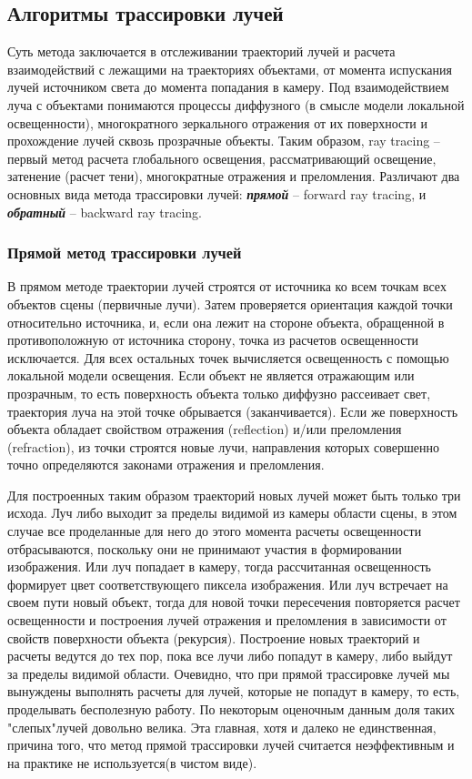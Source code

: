 \subsection{Алгоритмы трассировки лучей}
Суть метода заключается в отслеживании траекторий лучей и расчета взаимодействий с лежащими на траекториях объектами, от момента испускания лучей источником света до момента попадания в камеру. Под взаимодействием луча с объектами понимаются процессы диффузного (в смысле модели локальной освещенности), многократного зеркального отражения от их поверхности и прохождение лучей сквозь прозрачные объекты. Таким образом, ray tracing – первый метод расчета глобального освещения, рассматривающий освещение, затенение (расчет тени), многократные отражения и преломления. Различают два основных вида метода трассировки лучей: \textbf{\textit{прямой}} -- forward ray tracing, и \textbf{\textit{обратный}} -- backward ray tracing.

\subsubsection{Прямой метод трассировки лучей}
В прямом методе траектории лучей строятся от источника ко всем точкам всех объектов сцены (первичные лучи). Затем проверяется ориентация каждой точки относительно источника, и, если она лежит на стороне объекта, обращенной в противоположную от источника сторону, точка из расчетов освещенности исключается. Для всех остальных точек вычисляется освещенность с помощью локальной модели освещения. Если объект не является отражающим или прозрачным, то есть поверхность объекта только диффузно рассеивает свет, траектория луча на этой точке обрывается (заканчивается). Если же поверхность объекта обладает свойством отражения (reflection) и/или преломления (refraction), из точки строятся новые лучи, направления которых совершенно точно определяются законами отражения и преломления.
\par
    Для построенных таким образом траекторий новых лучей может быть только три исхода. Луч либо выходит за пределы видимой из камеры области сцены, в этом случае все проделанные для него до этого момента расчеты освещенности отбрасываются, поскольку они не принимают участия в формировании изображения. Или луч попадает в камеру, тогда рассчитанная освещенность формирует цвет соответствующего пиксела изображения. Или луч встречает на своем пути новый
объект, тогда для новой точки пересечения повторяется расчет освещенности и построения лучей отражения и преломления в зависимости от свойств поверхности объекта (рекурсия). Построение новых траекторий и расчеты ведутся до тех пор, пока все лучи либо попадут в камеру, либо выйдут за пределы видимой области. Очевидно, что при прямой трассировке лучей мы вынуждены выполнять расчеты для лучей, которые не попадут в камеру, то есть, проделывать бесполезную работу. По некоторым оценочным данным доля таких "слепых"лучей довольно велика. Эта главная, хотя и далеко не единственная, причина того, что метод прямой трассировки лучей считается неэффективным и на практике не используется(в чистом виде).

